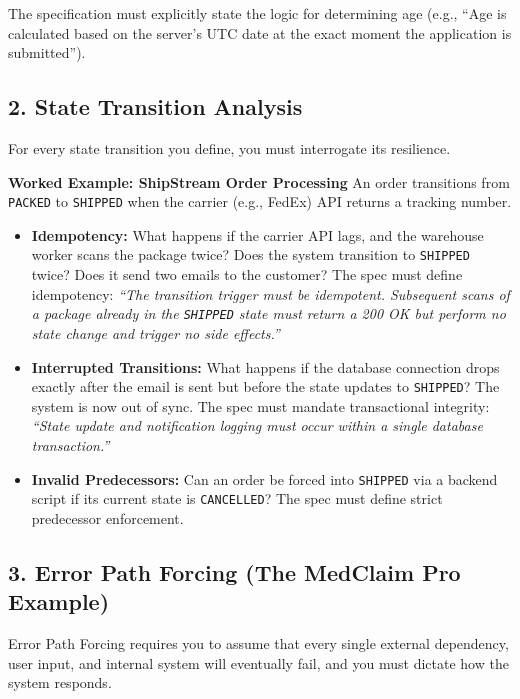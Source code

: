 The specification must explicitly state the logic for determining age
(e.g., ``Age is calculated based on the server's UTC date at the exact
moment the application is submitted'').

\subsection{2. State Transition
Analysis}\label{state-transition-analysis}

For every state transition you define, you must interrogate its
resilience.

\textbf{Worked Example: ShipStream Order Processing} An order
transitions from \texttt{PACKED} to \texttt{SHIPPED} when the carrier
(e.g., FedEx) API returns a tracking number.

\begin{itemize}
\tightlist
\item
  \textbf{Idempotency:} What happens if the carrier API lags, and the
  warehouse worker scans the package twice? Does the system transition
  to \texttt{SHIPPED} twice? Does it send two emails to the customer?
  The spec must define idempotency: \emph{``The transition trigger must
  be idempotent. Subsequent scans of a package already in the
  \texttt{SHIPPED} state must return a 200 OK but perform no state
  change and trigger no side effects.''}
\item
  \textbf{Interrupted Transitions:} What happens if the database
  connection drops exactly after the email is sent but before the state
  updates to \texttt{SHIPPED}? The system is now out of sync. The spec
  must mandate transactional integrity: \emph{``State update and
  notification logging must occur within a single database
  transaction.''}
\item
  \textbf{Invalid Predecessors:} Can an order be forced into
  \texttt{SHIPPED} via a backend script if its current state is
  \texttt{CANCELLED}? The spec must define strict predecessor
  enforcement.
\end{itemize}

\subsection{3. Error Path Forcing (The MedClaim Pro
Example)}\label{error-path-forcing-the-medclaim-pro-example}

Error Path Forcing requires you to assume that every single external
dependency, user input, and internal system will eventually fail, and
you must dictate how the system responds.

